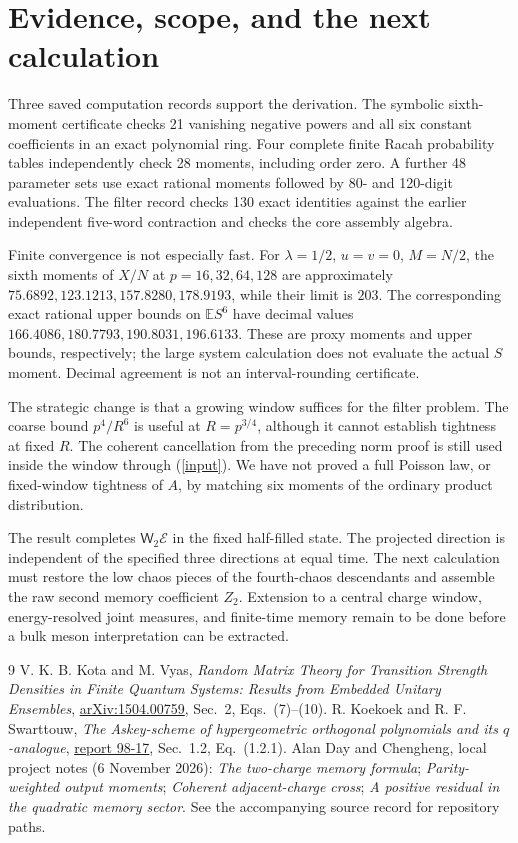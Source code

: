 \documentclass[11pt,a4paper]{article}
\newcommand{\EE}{\mathbb E}
\newcommand{\W}{\mathsf W_2}
\newcommand{\core}{\mathcal E}
\begin{document}
\newpage
\section{Evidence, scope, and the next calculation}
Three saved computation records support the derivation. The symbolic
sixth-moment certificate checks 21 vanishing negative powers and all
six constant coefficients in an exact polynomial ring. Four complete
finite Racah probability tables independently check 28 moments,
including order zero. A further 48 parameter sets use exact rational
moments followed by 80- and 120-digit evaluations. The filter record
checks 130 exact identities against the earlier independent
five-word contraction and checks the core assembly algebra.

Finite convergence is not especially fast. For $\lambda=1/2$,
$u=v=0$, $M=N/2$, the sixth moments of $X/N$ at
$p=16,32,64,128$ are approximately
$75.6892,123.1213,157.8280,178.9193$, while their limit is $203$.
The corresponding exact rational upper bounds on $\EE S^6$ have
decimal values $166.4086,180.7793,190.8031,196.6133$.
These are proxy moments and upper bounds, respectively; the large
system calculation does not evaluate the actual $S$ moment.
Decimal agreement is not an interval-rounding certificate.

The strategic change is that a growing window suffices for the
filter problem. The coarse bound $p^4/R^6$ is useful at
$R=p^{3/4}$, although it cannot establish tightness at fixed $R$.
The coherent cancellation from the preceding norm proof is still
used inside the window through (\ref{input}). We have not proved
a full Poisson law, or fixed-window tightness of $A$, by matching
six moments of the ordinary product distribution.

The result completes $\W\core$ in the fixed half-filled state.
The projected direction is independent of the specified three
directions at equal time. The next calculation must restore the low
chaos pieces of the fourth-chaos descendants and assemble the raw
second memory coefficient $Z_2$. Extension to a central charge window,
energy-resolved joint measures, and finite-time memory remain to be
done before a bulk meson interpretation can be extracted.

\begin{thebibliography}{9}
 V. K. B. Kota and M. Vyas,
\emph{Random Matrix Theory for Transition Strength Densities in Finite
Quantum Systems: Results from Embedded Unitary Ensembles},
\href{https://arxiv.org/abs/1504.00759}{arXiv:1504.00759},
Sec.~2, Eqs.~(7)--(10).
 R. Koekoek and R. F. Swarttouw,
\emph{The Askey-scheme of hypergeometric orthogonal polynomials and
its $q$-analogue},
\href{https://tudelft.roelofkoekoek.nl/documents/as98.pdf}{report 98-17},
Sec.~1.2, Eq.~(1.2.1).
 Alan Day and Chengheng, local project notes (6 November 2026):
\emph{The two-charge memory formula}; \emph{Parity-weighted output
moments}; \emph{Coherent adjacent-charge cross};
\emph{A positive residual in the quadratic memory sector}.
See the accompanying source record for repository paths.
\end{thebibliography}
\end{document}
